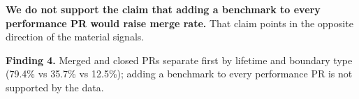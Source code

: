 \textbf{We do not support the claim that adding a benchmark to every performance PR would raise merge rate.} That claim points in the opposite direction of the material signals.

\begin{center}
\begin{tcolorbox}
\textbf{Finding 4.} Merged and closed PRs separate first by lifetime and boundary type (79.4\% vs 35.7\% vs 12.5\%); adding a benchmark to every performance PR is not supported by the data.
\end{tcolorbox}
\end{center}

